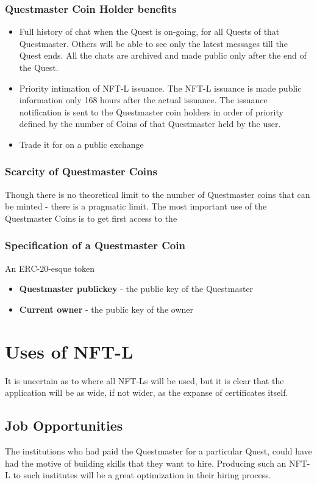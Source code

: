 \documentclass{article}
\begin{document}
      \subsubsection{Questmaster Coin Holder benefits}
        \begin{itemize}
          \item Full history of chat when the Quest is on-going, for all Quests of that Questmaster. Others will be able to see only the latest messages till the Quest ends. All the chats are archived and made public only after the end of the Quest.
          \item Priority intimation of NFT-L issuance. The NFT-L issuance is made public information only 168 hours after the actual issuance. The issuance notification is sent to the Questmaster coin holders in order of priority defined by the number of Coins of that Questmaster held by the user.
          \item Trade it for on a public exchange
        \end{itemize}
      \subsubsection{Scarcity of Questmaster Coins}
        Though there is no theoretical limit to the number of Questmaster coins that can be minted - there is a pragmatic limit.
        The most important use of the Questmaster Coins is to get first access to the 
      \subsubsection{Specification of a Questmaster Coin}
        An ERC-20-esque token
        \begin{itemize}
          \item \textbf{Questmaster publickey} - the public key of the Questmaster
          \item \textbf{Current owner } - the public key of the owner
        \end{itemize}
  \section{Uses of NFT-L}
    It is uncertain as to where all NFT-Ls will be used, but it is clear that the application will be as wide, if not wider, as the expanse of certificates itself.
    \subsection{Job Opportunities}
      The institutions who had paid the Questmaster for a particular Quest, could have had the motive of building skills that they want to hire. Producing such an NFT-L to such institutes will be a great optimization in their hiring process.
\end{document}
